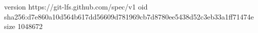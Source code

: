 version https://git-lfs.github.com/spec/v1
oid sha256:d7e860a10d564b617dd56609d781969cb7d8780ee5438d52c3eb33a1ff71474e
size 1048672
